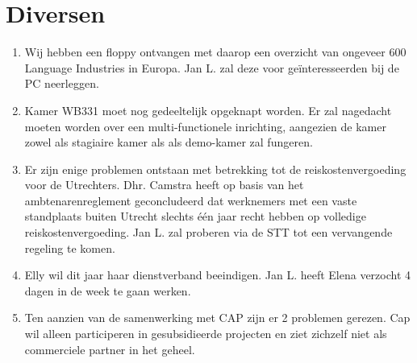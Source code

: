 \section {Diversen}
\begin{enumerate}
   \item Wij hebben een floppy ontvangen met daarop een overzicht van ongeveer 
600 Language Industries in Europa. Jan L. zal deze voor ge\"{i}nteresseerden 
bij de PC neerleggen. 
   \item Kamer WB331 moet nog gedeeltelijk opgeknapt worden. Er zal nagedacht 
moeten worden over een multi-functionele inrichting, aangezien de kamer zowel 
als stagiaire kamer als als demo-kamer zal fungeren.
   \item Er zijn enige problemen ontstaan met betrekking tot de 
reiskostenvergoeding voor de Utrechters. Dhr. Camstra heeft op basis van het 
ambtenarenreglement geconcludeerd dat werknemers met een vaste standplaats 
buiten Utrecht slechts \'{e}\'{e}n jaar recht hebben op volledige 
reiskostenvergoeding. Jan L. zal proberen via de STT tot een vervangende 
regeling te komen.
   \item Elly wil dit jaar haar dienstverband beeindigen. Jan L. heeft 
Elena verzocht 4 dagen in de week te gaan werken.
   \item Ten aanzien van de samenwerking met CAP zijn er 2 problemen gerezen. 
Cap wil alleen participeren in gesubsidieerde projecten en ziet zichzelf niet 
als commerciele partner in het geheel.
\end{enumerate}

